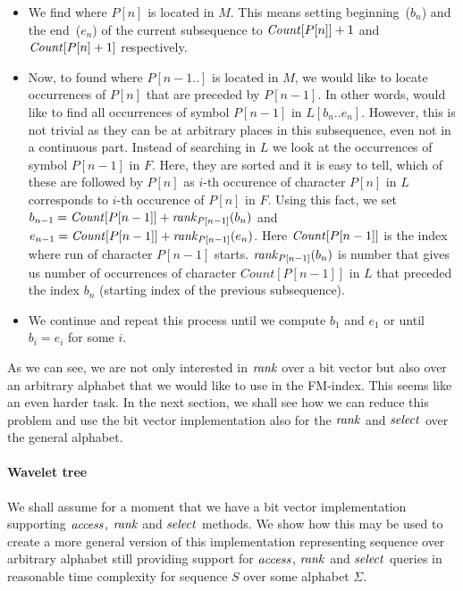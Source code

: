 \begin{itemize}
	\item We find where $P[n]$ is located in $M$. This means setting beginning~($b_{n}$) and
	the end~($e_{n}$) of the current subsequence to $\mathit{Count}[P[n]]+1$ and $\mathit{Count}[P[n]+1]$
	respectively.
	\item Now, to found where $P[n-1..]$ is located in $M$, we would like to locate occurrences
	of $P[n]$ that are preceded by $P[n-1]$. In other words, would like to find all
	occurrences of symbol $P[n-1]$ in $L[b_{n}..e_{n}]$. However, this is not trivial
	as they can be at arbitrary places in this subsequence, even not in a continuous
	part. Instead of searching in $L$ we look at the occurrences of symbol $P[n-1]$ in
	$F$. Here, they are sorted and it is easy to tell, which of these are followed by
	$P[n]$ as $i$-th occurence of character $P[n]$ in $L$ corresponds to $i$-th
	occurence of $P[n]$ in $F$. Using this fact, we set
	$b_{n-1} = \mathit{Count}[P[n-1]] + \mathit{rank}_{P[n-1]}(b_{n})$ and
	$e_{n-1} = \mathit{Count}[P[n-1]] + \mathit{rank}_{P[n-1]}(e_{n})$. Here $\mathit{Count}[P[n-1]]$
	is the index where run of character $P[n-1]$ starts. $\mathit{rank}_{P[n-1]}(b_{n})$
	is number that gives us number of occurrences of character $Count[P[n-1]]$ in $L$ that
	preceded the index $b_{n}$ (starting index of the previous subsequence).
	\item We continue and repeat this process until we compute $b_1$ and $e_1$ or until
	$b_i=e_i$ for some $i$.
\end{itemize}

As we can see, we are not only interested in $\mathit{rank}$ over a bit vector but also over an arbitrary
alphabet that we would like to use in the FM-index. This seems like an even harder task.
In the next section, we shall see how we can reduce this problem and use the bit vector
implementation also for the $\mathit{rank}$ and $\mathit{select}$ over the general alphabet.

\paragraph{Wavelet tree}
\label{section:WaweletTree}

We shall assume for a moment that we have a bit vector implementation supporting
$\mathit{access}$, $\mathit{rank}$ and $\mathit{select}$ methods. We show how this may be used to create
a more general version of this implementation representing sequence over arbitrary
alphabet still providing support for $\mathit{access}$, $\mathit{rank}$ and $\mathit{select}$ queries in
reasonable time complexity for sequence $S$ over some alphabet $\Sigma$.

